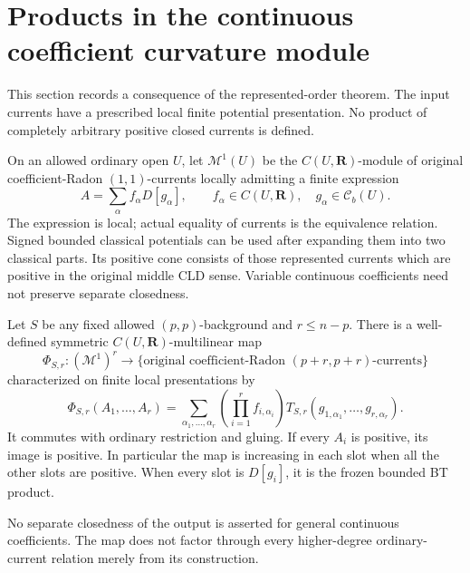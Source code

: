 \section{Products in the continuous coefficient curvature module}
\label{sec:r6-continuous-curvature-module-products}

This section records a consequence of the represented-order theorem.
The input currents have a prescribed local finite potential
presentation. No product of completely arbitrary positive closed
currents is defined.

\begin{definition}
On an allowed ordinary open $U$, let $\mathscr M^1(U)$ be the
$C(U,\mathbf R)$-module of original coefficient-Radon $(1,1)$-currents
locally admitting a finite expression
\[
                         A=\sum_{\alpha}f_\alpha D[g_\alpha],
 \qquad f_\alpha\in C(U,\mathbf R),\quad g_\alpha\in\mathcal C_b(U).
\]
The expression is local; actual equality of currents is the equivalence
relation. Signed bounded classical potentials can be used after
expanding them into two classical parts. Its positive cone consists
of those represented currents which are positive in the original
middle CLD sense. Variable continuous coefficients need not preserve
separate closedness.
\end{definition}

\begin{theorem}
\label{thm:r6-positive-continuous-module-products}
Let $S$ be any fixed allowed $(p,p)$-background and $r\le n-p$.
There is a well-defined symmetric $C(U,\mathbf R)$-multilinear map
\[
 \Phi_{S,r}:(\mathscr M^1)^r\longrightarrow
       \{\text{original coefficient-Radon $(p+r,p+r)$-currents}\}
\]
characterized on finite local presentations by
\begin{equation}
 \Phi_{S,r}(A_1,\ldots,A_r)
 =\sum_{\alpha_1,\ldots,\alpha_r}
    \left(\prod_{i=1}^r f_{i,\alpha_i}\right)
    T_{S,r}(g_{1,\alpha_1},\ldots,g_{r,\alpha_r}).
 \label{eq:r6-continuous-module-product}
\end{equation}
It commutes with ordinary restriction and gluing. If every $A_i$ is
positive, its image is positive. In particular the map is increasing
in each slot when all the other slots are positive. When every slot
is $D[g_i]$, it is the frozen bounded BT product.

No separate closedness of the output is asserted for general
continuous coefficients. The map does not factor through every
higher-degree ordinary-current relation merely from its construction.
\end{theorem}

